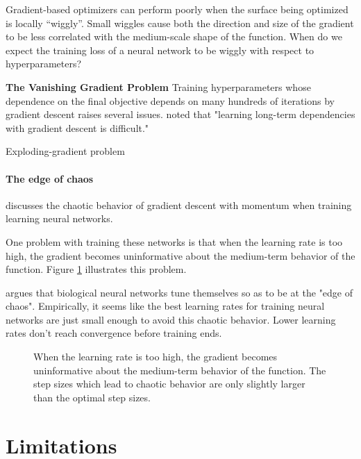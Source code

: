 \documentclass{article}
\begin{document}
Gradient-based optimizers can perform poorly when the surface being optimized is locally ``wiggly''.
Small wiggles cause both the direction and size of the gradient to be less correlated with the medium-scale shape of the function.
When do we expect the training loss of a neural network to be wiggly with respect to hyperparameters?

\textbf{The Vanishing Gradient Problem}
Training hyperparameters whose dependence on the final objective depends on many hundreds of iterations by gradient descent raises several issues.
\citet{bengio1994learning} noted that "learning long-term dependencies with gradient descent is difficult."

Exploding-gradient problem~\cite{pascanu2012understanding}

\paragraph{The edge of chaos}
\citet*[Chapter 4]{pearlmutter1996investigation} discusses the chaotic behavior of gradient descent with momentum when training learning neural networks.

One problem with training these networks is that when the learning rate is too high, the gradient becomes uninformative about the medium-term behavior of the function.
Figure \ref{fig:chaos} illustrates this problem.

\cite{pearlmutter2009sleep} argues that biological neural networks tune themselves so as to be at the "edge of chaos".
Empirically, it seems like the best learning rates for training neural networks are just small enough to avoid this chaotic behavior.
Lower learning rates don't reach convergence before training ends.


\begin{figure}[h!]
\vskip 0.2in
\begin{center}
\caption{When the learning rate is too high, the gradient becomes uninformative about the medium-term behavior of the function.
The step sizes which lead to chaotic behavior are only slightly larger than the optimal step sizes.}
\label{fig:chaos}
\end{center}
\vskip -0.2in
\end{figure} 



\section{Limitations}
\end{document}
